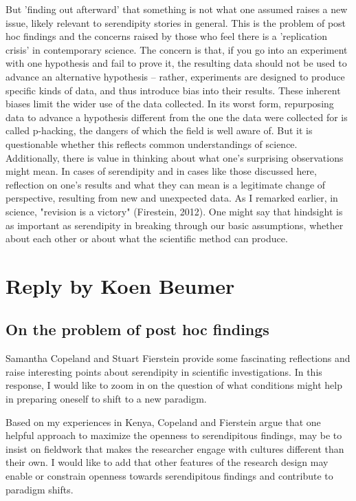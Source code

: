 \documentclass[authordate, commentary]{jote-new-article}
\begin{document}
	But 'finding out afterward' that something is not what one assumed raises a new issue, likely relevant to serendipity stories in general. This is the problem of post hoc findings and the concerns raised by those who feel there is a 'replication crisis' in contemporary science. The concern is that, if you go into an experiment with one hypothesis and fail to prove it, the resulting data should not be used to advance an alternative hypothesis -- rather, experiments are designed to produce specific kinds of data, and thus introduce bias into their results. These inherent biases limit the wider use of the data collected. In its worst form, repurposing data to advance a hypothesis different from the one the data were collected for is called p-hacking, the dangers of which the field is well aware of. But it is questionable whether this reflects common understandings of science. Additionally, there is value in thinking about what one's surprising observations might mean. In cases of serendipity and in cases like those discussed here, reflection on one's results and what they can mean is a legitimate change of perspective, resulting from new and unexpected data. As I remarked earlier, in science, "revision is a victory" (Firestein, 2012). One might say that hindsight is as important as serendipity in breaking through our basic assumptions, whether about each other or about what the scientific method can produce.



	\section{Reply by Koen Beumer}



	\subsection{On the problem of post hoc findings}



	Samantha Copeland and Stuart Fierstein provide some fascinating reflections and raise interesting points about serendipity in scientific investigations. In this response, I would like to zoom in on the question of what conditions might help in preparing oneself to shift to a new paradigm.



	Based on my experiences in Kenya, Copeland and Fierstein argue that one helpful approach to maximize the openness to serendipitous findings, may be to insist on fieldwork that makes the researcher engage with cultures different than their own. I would like to add that other features of the research design may enable or constrain openness towards serendipitous findings and contribute to paradigm shifts.
\end{document}

